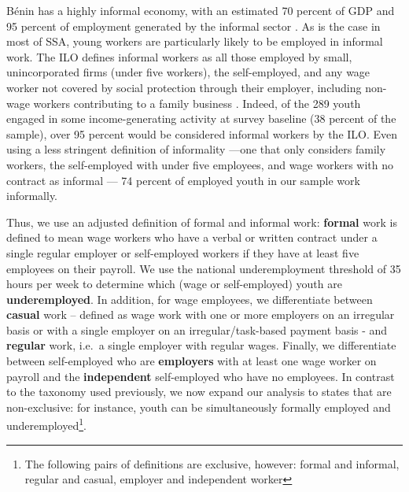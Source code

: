 \documentclass[
  a4paper, twoside, 12pt]{book}
\begin{document}
Bénin has a highly informal economy, with an estimated 70 percent of GDP and 95 percent of employment generated by the informal sector \autocite{benhassine2018}. As is the case in most of SSA, young workers are particularly likely to be employed in informal work. The ILO defines informal workers as all those employed by small, unincorporated firms (under five workers), the self-employed, and any wage worker not covered by social protection through their employer, including non-wage workers contributing to a family business \autocite{sumberg2021}. Indeed, of the 289 youth engaged in some income-generating activity at survey baseline (38 percent of the sample), over 95 percent would be considered informal workers by the ILO. Even using a less stringent definition of informality ---one that only considers family workers, the self-employed with under five employees, and wage workers with no contract as informal --- 74 percent of employed youth in our sample work informally.

Thus, we use an adjusted definition of formal and informal work: \textbf{formal} work is defined to mean wage workers who have a verbal or written contract under a single regular employer or self-employed workers if they have at least five employees on their payroll. We use the national underemployment threshold of 35 hours per week to determine which (wage or self-employed) youth are \textbf{underemployed}. In addition, for wage employees, we differentiate between \textbf{casual} work -- defined as wage work with one or more employers on an irregular basis or with a single employer on an irregular/task-based payment basis - and \textbf{regular} work, i.e.~a single employer with regular wages. Finally, we differentiate between self-employed who are \textbf{employers} with at least one wage worker on payroll and the \textbf{independent} self-employed who have no employees. In contrast to the taxonomy used previously, we now expand our analysis to states that are non-exclusive: for instance, youth can be simultaneously formally employed and underemployed\footnote{The following pairs of definitions are exclusive, however: formal and informal, regular and casual, employer and independent worker}.

\begin{singlespacing}

\end{singlespacing}
\end{document}
